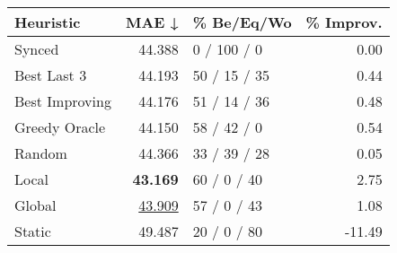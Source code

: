 \begin{tabular}{lrlr}
\toprule
\textbf{Heuristic} & \textbf{MAE ↓} & \textbf{\% Be/Eq/Wo} & \textbf{\% Improv.} \\
\midrule
            Synced &         44.388 &          0 / 100 / 0 &                0.00 \\
\midrule
       Best Last 3 &         44.193 &         50 / 15 / 35 &                0.44 \\
    Best Improving &         44.176 &         51 / 14 / 36 &                0.48 \\
\addlinespace
     Greedy Oracle &         44.150 &          58 / 42 / 0 &                0.54 \\
            Random &         44.366 &         33 / 39 / 28 &                0.05 \\
\midrule
             Local &         \textbf{43.169} &          60 / 0 / 40 &                2.75 \\
            Global &         \underline{43.909} &          57 / 0 / 43 &                1.08 \\
\midrule
            Static &         49.487 &          20 / 0 / 80 &              -11.49 \\
\bottomrule
\end{tabular}

\label{tab:iid_lr01_le1_bs4_Summary}
